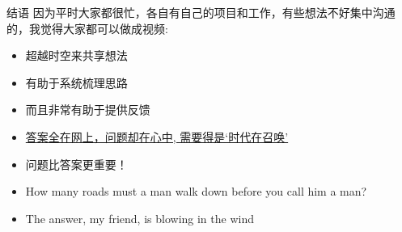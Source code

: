\documentclass[handout]{ctexbeamer}
\begin{document}
\begin{frame}{结语}
	因为平时大家都很忙，各自有自己的项目和工作，有些想法不好集中沟通的，我觉得大家都可以做成视频:
	\begin{itemize}
	\setlength\itemsep{0.6em}
		\item 超越时空来共享想法
		\item 有助于系统梳理思路
		\item 而且非常有助于提供反馈
		\item \underline{答案全在网上，问题却在心中, 需要得是`时代在召唤'}
		\item 问题比答案更重要！
		\item How many roads must a man walk down before you call him a man?
		\item The answer, my friend, is blowing in the wind
	\end{itemize}
\end{frame}
\end{document}
